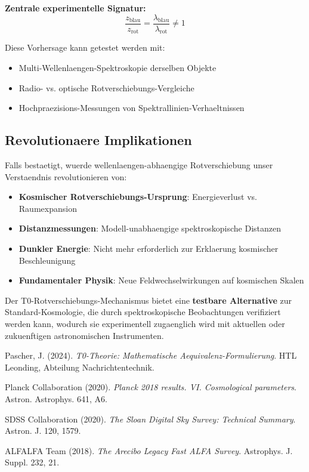 \documentclass[12pt,a4paper]{article}
\theoremstyle{definition}
\begin{document}
	\begin{formel}
		\textbf{Zentrale experimentelle Signatur:}
		\begin{equation}
			\boxed{\frac{z_{\text{blau}}}{z_{\text{rot}}} = \frac{\lambda_{\text{blau}}}{\lambda_{\text{rot}}} \neq 1}
		\end{equation}
	\end{formel}
	
	Diese Vorhersage kann getestet werden mit:
	\begin{itemize}
		\item Multi-Wellenlaengen-Spektroskopie derselben Objekte
		\item Radio- vs. optische Rotverschiebungs-Vergleiche
		\item Hochpraezisions-Messungen von Spektrallinien-Verhaeltnissen
	\end{itemize}
	
	\subsection{Revolutionaere Implikationen}
	
	\begin{wichtig}
		Falls bestaetigt, wuerde wellenlaengen-abhaengige Rotverschiebung unser Verstaendnis revolutionieren von:
		\begin{itemize}
			\item \textbf{Kosmischer Rotverschiebungs-Ursprung}: Energieverlust vs. Raumexpansion
			\item \textbf{Distanzmessungen}: Modell-unabhaengige spektroskopische Distanzen
			\item \textbf{Dunkler Energie}: Nicht mehr erforderlich zur Erklaerung kosmischer Beschleunigung
			\item \textbf{Fundamentaler Physik}: Neue Feldwechselwirkungen auf kosmischen Skalen
		\end{itemize}
	\end{wichtig}
	
	Der T0-Rotverschiebungs-Mechanismus bietet eine \textbf{testbare Alternative} zur Standard-Kosmologie, die durch spektroskopische Beobachtungen verifiziert werden kann, wodurch sie experimentell zugaenglich wird mit aktuellen oder zukuenftigen astronomischen Instrumenten.
	
	
	\begin{thebibliography}{9}
		
		Pascher, J. (2024). \textit{T0-Theorie: Mathematische Aequivalenz-Formulierung}. HTL Leonding, Abteilung Nachrichtentechnik.
		
		Planck Collaboration (2020). \textit{Planck 2018 results. VI. Cosmological parameters}. Astron. Astrophys. 641, A6.
		
		SDSS Collaboration (2020). \textit{The Sloan Digital Sky Survey: Technical Summary}. Astron. J. 120, 1579.
		
		ALFALFA Team (2018). \textit{The Arecibo Legacy Fast ALFA Survey}. Astrophys. J. Suppl. 232, 21.
		
	\end{thebibliography}
	
\end{document}
